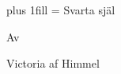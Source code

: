 

{%
    \parindent=0pt%
    \leftskip 0pt plus 1fill\relax
    \rightskip=\leftskip
    \parfillskip=0pt\relax
    \baselineskip
    {
        \scalemain\typoscale[2074/2074]%
        Svarta själ
    }\par
    \baselineskip
    {
        \scalemain\typoscale[1440/1440]%
        Av
    }\par
    \baselineskip
    {
        \scalemain\typoscale[2074/2074]%
        Victoria af Himmel
    }\par
}